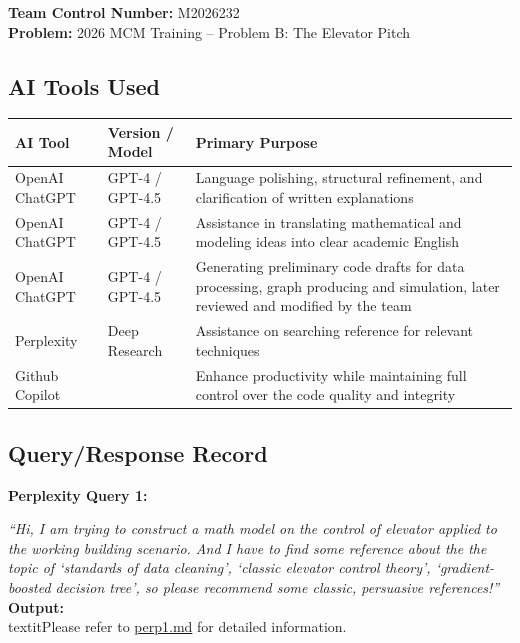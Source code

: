\noindent\textbf{Team Control Number:} M2026232\\
\textbf{Problem:} 2026 MCM Training -- Problem B: The Elevator Pitch\\

\vspace{0.1em}
\subsection*{AI Tools Used}
\begin{table}[h!]
\centering
\small
\setlength{\tabcolsep}{6pt}
\renewcommand{\arraystretch}{1.15}
\begin{tabular}{|p{3.2cm}|p{3.2cm}|p{8.2cm}|}
\hline
\textbf{AI Tool} & \textbf{Version / Model} & \textbf{Primary Purpose} \\
\hline
OpenAI ChatGPT  & GPT-4 / GPT-4.5 &
Language polishing, structural refinement, and clarification of written explanations \\
OpenAI ChatGPT & GPT-4 / GPT-4.5 &
Assistance in translating mathematical and modeling ideas into clear academic English \\
OpenAI ChatGPT & GPT-4 / GPT-4.5 &
Generating preliminary code drafts for data processing, graph producing and simulation, later reviewed and modified by the team \\
Perplexity & Deep Research & Assistance on searching reference for relevant techniques\\
Github Copilot & \center{---} & Enhance productivity while maintaining full control over the code quality and integrity\\
\hline
\end{tabular}
\end{table}

\subsection*{Query/Response Record}

\textbf{Perplexity Query 1:}

\textit{``Hi, I am trying to construct a math model on the control of elevator applied to the working building scenario. And I have to find some reference about the the topic of `standards of data cleaning', `classic elevator control theory', `gradient-boosted decision tree', so please recommend some classic, persuasive references!''}\\

\textbf{Output:}
\\textit{Please refer to \href{https://github.com/Jincan-LI-HUB/2026_MCM_Simulation_Problem_B/blob/master/AI_declaration_files/perp1.md}{perp1.md} for detailed information.}\\

